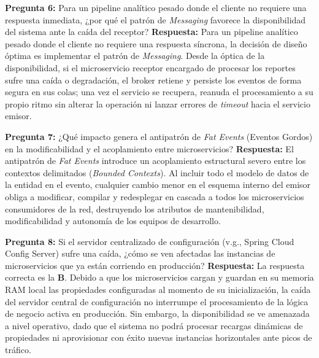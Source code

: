 \vspace{4mm}

\noindent\textbf{Pregunta 6:} Para un pipeline analítico pesado donde el cliente no requiere una respuesta inmediata, ¿por qué el patrón de \textit{Messaging} favorece la disponibilidad del sistema ante la caída del receptor?
\newline
\textbf{Respuesta:} Para un pipeline analítico pesado donde el cliente no requiere una respuesta síncrona, la decisión de diseño óptima es implementar el patrón de \textit{Messaging}. Desde la óptica de la disponibilidad, si el microservicio receptor encargado de procesar los reportes sufre una caída o degradación, el broker retiene y persiste los eventos de forma segura en sus colas; una vez el servicio se recupera, reanuda el procesamiento a su propio ritmo sin alterar la operación ni lanzar errores de \textit{timeout} hacia el servicio emisor.

\vspace{4mm}

\noindent\textbf{Pregunta 7:} ¿Qué impacto genera el antipatrón de \textit{Fat Events} (Eventos Gordos) en la modificabilidad y el acoplamiento entre microservicios?
\newline
\textbf{Respuesta:} El antipatrón de \textit{Fat Events} introduce un acoplamiento estructural severo entre los contextos delimitados (\textit{Bounded Contexts}). Al incluir todo el modelo de datos de la entidad en el evento, cualquier cambio menor en el esquema interno del emisor obliga a modificar, compilar y redesplegar en cascada a todos los microservicios consumidores de la red, destruyendo los atributos de mantenibilidad, modificabilidad y autonomía de los equipos de desarrollo.

\vspace{4mm}

\noindent\textbf{Pregunta 8:} Si el servidor centralizado de configuración (v.g., Spring Cloud Config Server) sufre una caída, ¿cómo se ven afectadas las instancias de microservicios que ya están corriendo en producción?
\newline
\textbf{Respuesta:} La respuesta correcta es la \textbf{B}. Debido a que los microservicios cargan y guardan en su memoria RAM local las propiedades configuradas al momento de su inicialización, la caída del servidor central de configuración no interrumpe el procesamiento de la lógica de negocio activa en producción. Sin embargo, la disponibilidad se ve amenazada a nivel operativo, dado que el sistema no podrá procesar recargas dinámicas de propiedades ni aprovisionar con éxito nuevas instancias horizontales ante picos de tráfico.

